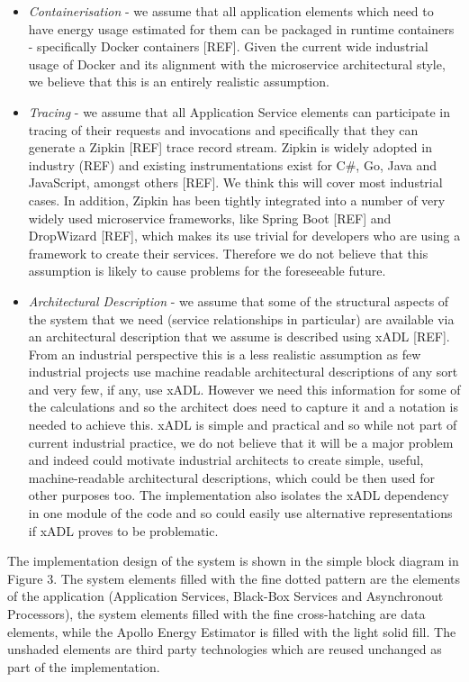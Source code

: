 \begin{itemize}
\item \emph{Containerisation} - we assume that all application elements which need to have energy usage estimated for them can be packaged in runtime containers - specifically Docker containers [REF].  Given the current wide industrial usage of Docker and its alignment with the microservice architectural style, we believe that this is an entirely realistic assumption.
\item \emph{Tracing} - we assume that all Application Service elements can participate in tracing of their requests and invocations and specifically that they can generate a Zipkin [REF] trace record stream.  Zipkin is widely adopted in industry (REF) and existing instrumentations exist for C\#, Go, Java and JavaScript, amongst others [REF].  We think this will cover most industrial cases.  In addition, Zipkin has been tightly integrated into a number of very widely used microservice frameworks, like Spring Boot [REF] and DropWizard [REF], which makes its use trivial for developers who are using a framework to create their services.  Therefore we do not believe that this assumption is likely to cause problems for the foreseeable future.
\item \emph{Architectural Description} - we assume that some of the structural aspects of the system that we need (service relationships in particular) are available via an architectural description that we assume is described using xADL [REF].  From an industrial perspective this is a less realistic assumption as few industrial projects use machine readable architectural descriptions of any sort and very few, if any, use xADL.  However we need this information for some of the calculations and so the architect does need to capture it and a notation is needed to achieve this. xADL is simple and practical and so while not part of current industrial practice, we do not believe that it will be a major problem and indeed could motivate industrial architects to create simple, useful, machine-readable architectural descriptions, which could be then used for other purposes too.  The implementation also isolates the xADL dependency in one module of the code and so could easily use alternative representations if xADL proves to be problematic.
\end{itemize}

The implementation design of the system is shown in the simple block diagram in Figure 3. The system elements filled with the fine dotted pattern are the elements of the application (Application Services, Black-Box Services and Asynchronout Processors), the system elements filled with the fine cross-hatching are data elements, while the Apollo Energy Estimator is filled with the light solid fill.  The unshaded elements are third party technologies which are reused unchanged as part of the implementation.

